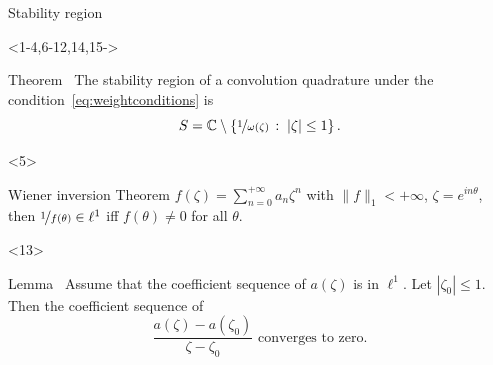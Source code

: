\documentclass[aspectratio=169,xcolor=dvipsnames]{beamer}
\begin{document}
\begin{frame}{Stability region}
\begin{onlyenv}<1-4,6-12,14,15->
\begin{alertblock}{Theorem~\parencite[Theorem 2.1]{LubichConvergence}}
	The stability region of a convolution quadrature under the condition~\eqref{eq:weightconditions} is
	\[
	S = \mathbb{C} \setminus \left\lbrace \nicefrac{1}{\omega(\zeta)} \,:\; |\zeta| \leq 1 \right\rbrace.
	\]
\end{alertblock}
\end{onlyenv}
\begin{onlyenv}<5>
\begin{exampleblock}{Wiener inversion Theorem}
$f(\zeta) = \sum_{n=0}^{+\infty} a_n \zeta^n$ with $\|f\|_1 < +\infty$, $\zeta = e^{in\theta}$, then $\nicefrac{1}{f(\theta)} \in \ell^1$ iff $f(\theta) \neq 0$ for all $\theta$.
\end{exampleblock}
\end{onlyenv}
\begin{onlyenv}<13>
\begin{exampleblock}{Lemma~\parencite[Lemma~2.1]{LubichConvergence}}
Assume that the coefficient sequence of $a(\zeta)$ is in $\ell^1$. Let $|\zeta_0| \leq 1$. Then the coefficient sequence of 
\[
\frac{a(\zeta) - a(\zeta_0)}{\zeta - \zeta_0} \text{ converges to zero.}
\]
\end{exampleblock}
\end{onlyenv}


\end{frame}
\end{document}
